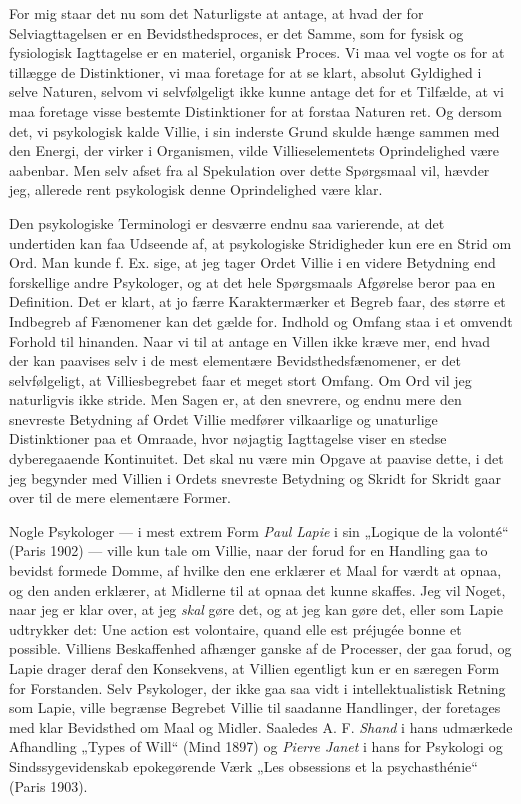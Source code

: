 \documentclass[12pt,a4paper,openany]{book}
\newcommand{\opage}[1]{\marginnote{\footnotesize\textit{[#1]}}}
\begin{document}
For mig staar det nu som det Naturligste at antage, at
hvad der for Selviagttagelsen er en Bevidsthedsproces, er det
Samme, som for fysisk og fysiologisk Iagttagelse er en materiel,
organisk Proces. Vi maa vel vogte os for at tillægge de Distinktioner,
vi maa foretage for at se klart, absolut Gyldighed
i selve Naturen, selvom vi selvfølgeligt ikke kunne antage det
for et Tilfælde, at vi maa foretage visse bestemte Distinktioner
for at forstaa Naturen ret. Og dersom det, vi psykologisk kalde
Villie, i sin inderste Grund skulde hænge sammen med den
Energi, der virker i Organismen, vilde Villieselementets Oprindelighed
være aabenbar. Men selv afset fra al Spekulation
over dette Spørgsmaal vil, hævder jeg, allerede rent psykologisk
denne Oprindelighed være klar.

\setcounter{footnote}{0}%
\opage{34}Den psykologiske Terminologi er desværre endnu saa varierende,
at det undertiden kan faa Udseende af, at psykologiske
Stridigheder kun ere en Strid om Ord. Man kunde f. Ex. sige,
at jeg tager Ordet Villie i en videre Betydning end forskellige
andre Psykologer, og at det hele Spørgsmaals Afgørelse beror
paa en Definition. Det er klart, at jo færre Karaktermærker
et Begreb faar, des større et Indbegreb af Fænomener kan det
gælde for. Indhold og Omfang staa i et omvendt Forhold til
hinanden. Naar vi til at antage en Villen ikke kræve mer,
end hvad der kan paavises selv i de mest elementære Bevidsthedsfænomener,
er det selvfølgeligt, at Villiesbegrebet faar et
meget stort Omfang. Om Ord vil jeg naturligvis ikke stride.
Men Sagen er, at den snevrere, og endnu mere den snevreste
Betydning af Ordet Villie medfører vilkaarlige og unaturlige
Distinktioner paa et Omraade, hvor nøjagtig Iagttagelse viser
en stedse dyberegaaende Kontinuitet. Det skal nu være min
Opgave at paavise dette, i det jeg begynder med Villien i
Ordets snevreste Betydning og Skridt for Skridt gaar over til
de mere elementære Former.

Nogle Psykologer --- i mest extrem Form \textit{Paul Lapie} i sin
„Logique de la volonté“ (Paris 1902) --- ville kun tale om Villie,
naar der forud for en Handling gaa to bevidst formede Domme,
af hvilke den ene erklærer et Maal for værdt at opnaa, og den
anden erklærer, at Midlerne til at opnaa det kunne skaffes.
Jeg vil Noget, naar jeg er klar over, at jeg \textit{skal} gøre det, og
at jeg kan gøre det, eller som Lapie udtrykker det: Une action
est volontaire, quand elle est préjugée bonne et possible. Villiens
Beskaffenhed afhænger ganske af de Processer, der gaa forud,
og Lapie drager deraf den Konsekvens, at Villien egentligt
kun er en særegen Form for Forstanden. Selv Psykologer, der
ikke gaa saa vidt i intellektualistisk Retning som Lapie, ville
begrænse Begrebet Villie til saadanne Handlinger, der foretages
med klar Bevidsthed om Maal og Midler. Saaledes A. F. \textit{Shand}
i hans udmærkede Afhandling „Types of Will“ (Mind 1897)
og \textit{Pierre Janet} i hans for Psykologi og Sindssygevidenskab
epokegørende Værk „Les obsessions et la psychasthénie“ (Paris
1903).
\end{document}
